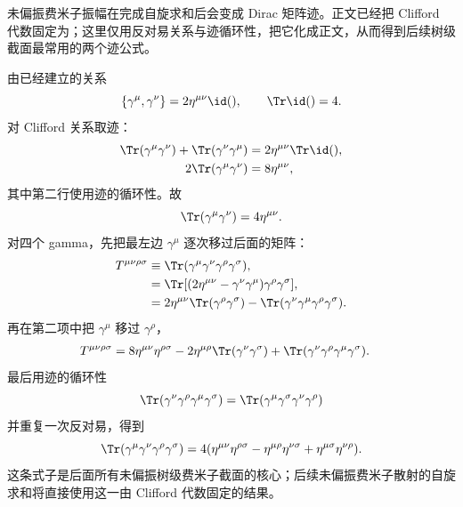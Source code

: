 \begin{derivation}

未偏振费米子振幅在完成自旋求和后会变成 Dirac 矩阵迹。正文已经把 Clifford 代数固定为；这里仅用反对易关系与迹循环性，把它化成正文，从而得到后续树级截面最常用的两个迹公式。



由已经建立的关系
\begin{equation*}
 \{\gamma^\mu,\gamma^\nu\}=2\eta^{\mu\nu}\id(),
 \qquad
 \Tr\id()=4.
\end{equation*}
对 Clifford 关系取迹：
\begin{align*}
 \Tr(\gamma^\mu\gamma^\nu)
 +\Tr(\gamma^\nu\gamma^\mu)
 &=2\eta^{\mu\nu}\Tr\id(),\\
 2\Tr(\gamma^\mu\gamma^\nu)
 &=8\eta^{\mu\nu},
\end{align*}
其中第二行使用迹的循环性。故
\begin{equation*}
 {\Tr(\gamma^\mu\gamma^\nu)=4\eta^{\mu\nu}.}
 \end{equation*}
对四个 gamma，先把最左边 $\gamma^\mu$ 逐次移过后面的矩阵：
\begin{align*}
 T^{\mu\nu\rho\sigma}
 &\equiv\Tr(\gamma^\mu\gamma^\nu\gamma^\rho\gamma^\sigma),\\
 &=\Tr[(2\eta^{\mu\nu}-\gamma^\nu\gamma^\mu)
 \gamma^\rho\gamma^\sigma],\\
 &=2\eta^{\mu\nu}\Tr(\gamma^\rho\gamma^\sigma)
 -\Tr(\gamma^\nu\gamma^\mu\gamma^\rho\gamma^\sigma).
\end{align*}
再在第二项中把 $\gamma^\mu$ 移过 $\gamma^\rho$，
\begin{align*}
 T^{\mu\nu\rho\sigma}
 &=8\eta^{\mu\nu}\eta^{\rho\sigma}
 -2\eta^{\mu\rho}\Tr(\gamma^\nu\gamma^\sigma)
 +\Tr(\gamma^\nu\gamma^\rho\gamma^\mu\gamma^\sigma).
\end{align*}
最后用迹的循环性
\begin{equation*}
 \Tr(\gamma^\nu\gamma^\rho\gamma^\mu\gamma^\sigma)
 =\Tr(\gamma^\mu\gamma^\sigma\gamma^\nu\gamma^\rho)
\end{equation*}
并重复一次反对易，得到
\begin{equation*}
 {
 \Tr(\gamma^\mu\gamma^\nu\gamma^\rho\gamma^\sigma)
 =4(\eta^{\mu\nu}\eta^{\rho\sigma}
 -\eta^{\mu\rho}\eta^{\nu\sigma}
 +\eta^{\mu\sigma}\eta^{\nu\rho}).}
 \end{equation*}
这条式子是后面所有未偏振树级费米子截面的核心；后续未偏振费米子散射的自旋求和将直接使用这一由 Clifford 代数固定的结果。
\end{derivation}

